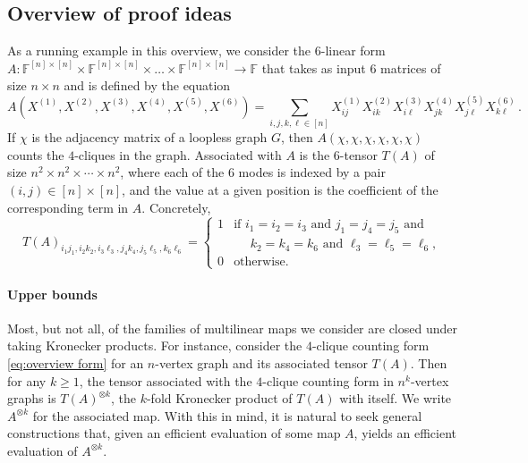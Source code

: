 \documentclass{toc}
\newcommand{\F}{\ensuremath{\mathbb{F}}}
\begin{document}
\subsection{Overview of proof ideas}

\label{sect:ideas}

As a running example in this overview, we consider the $6$-linear
%
%
form  %
$A: \F^{[n] \times [n]} \times \F^{[n] \times [n]} \times \ldots
\times \F^{[n] \times [n]} \rightarrow \F$
%
%
that takes as input $6$ matrices of size $n \times n$ and is
defined by the equation  %
\begin{equation}
\label{eq:overview form}
A(X^{(1)}, X^{(2)}, X^{(3)}, X^{(4)}, X^{(5)}, X^{(6)}) = \sum_{i, j, k, \ell \in[n]} X^{(1)}_{ij} X^{(2)}_{ik} X^{(3)}_{i\ell} X^{(4)}_{jk} X^{(5)}_{j\ell} X^{(6)}_{k\ell}\,.
\end{equation}
If $\chi$ is the adjacency matrix of a loopless graph $G$, then $A(\chi, \chi, \chi, \chi, \chi,
\chi)$ counts the %
$4$-cliques in the graph.  Associated with $A$ is the $6$-tensor $T(A)$ of size $n^2 \times n^2 \times \cdots \times n^2$, where each of the $6$ modes is indexed by a pair $(i, j) \in [n] \times [n]$, 
and the value at a given position is the coefficient of the corresponding
term in $A$.  Concretely,
\[
%
%
%
%
%
T(A)_{i_1j_1, i_2k_2, i_3\ell_3, j_4k_4, j_5\ell_5, k_6\ell_6} =
\begin{cases}
  1 & \!\!\! \text{if $i_1 = i_2 = i_3$ and $j_1 = j_4 = j_5$ and}\\
  & \!\!\! \text{$\,\,\,\,\,\,\,\, k_2 = k_4 = k_6$ and $\ell_3 = \ell_5 = \ell_6$},\\
  0 & \!\!\! \text{otherwise}.
\end{cases}
\]

\paragraph*{Upper bounds}

Most, but not all, of the families of multilinear maps we consider are
closed under taking Kronecker products.  For instance, consider the
$4$-clique counting form \eqref{eq:overview form} for an $n$-vertex
graph and its associated tensor $T(A)$.  Then for any
$k \ge 1$, the tensor associated with the $4$-clique counting form in
$n^k$-vertex graphs is $T(A)^{\otimes k}$, the $k$-fold Kronecker
product of $T(A)$ with itself.  We write $A^{\otimes k}$ for the
associated map.  With this in mind, it is natural to seek general
constructions that, given an efficient evaluation
of some map $A$, yields an efficient evaluation of $A^{\otimes k}$.
\end{document}

